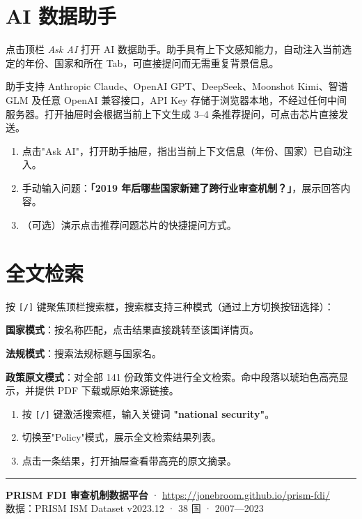\documentclass[12pt,a4paper]{article}
\newcommand{\uielem}[1]{\textit{#1}}
\newcommand{\keycap}[1]{\texttt{\footnotesize[#1]}}
\begin{document}
\section{AI 数据助手}

点击顶栏 \uielem{Ask AI} 打开 AI 数据助手。助手具有上下文感知能力，自动注入当前选定的年份、国家和所在 Tab，可直接提问而无需重复背景信息。

助手支持 Anthropic Claude、OpenAI GPT、DeepSeek、Moonshot Kimi、智谱 GLM 及任意 OpenAI 兼容接口，API Key 存储于浏览器本地，不经过任何中间服务器。打开抽屉时会根据当前上下文生成 3–4 条推荐提问，可点击芯片直接发送。

\begin{demobox}
  \begin{enumerate}
    \item 点击"Ask AI"，打开助手抽屉，指出当前上下文信息（年份、国家）已自动注入。
    \item 手动输入问题：\textbf{「2019 年后哪些国家新建了跨行业审查机制？」}，展示回答内容。
    \item （可选）演示点击推荐问题芯片的快捷提问方式。
  \end{enumerate}
\end{demobox}

\section{全文检索}

按 \keycap{/} 键聚焦顶栏搜索框，搜索框支持三种模式（通过上方切换按钮选择）：

\textbf{国家模式}：按名称匹配，点击结果直接跳转至该国详情页。

\textbf{法规模式}：搜索法规标题与国家名。

\textbf{政策原文模式}：对全部 141 份政策文件进行全文检索。命中段落以琥珀色高亮显示，并提供 PDF 下载或原始来源链接。

\begin{demobox}
  \begin{enumerate}
    \item 按 \keycap{/} 键激活搜索框，输入关键词 \textbf{"national security"}。
    \item 切换至"Policy"模式，展示全文检索结果列表。
    \item 点击一条结果，打开抽屉查看带高亮的原文摘录。
  \end{enumerate}
\end{demobox}

\vspace{2em}
\hrule
\vspace{0.8em}
{\small\color{gray}
\textbf{PRISM FDI 审查机制数据平台} · \url{https://jonebroom.github.io/prism-fdi/}\\
数据：PRISM ISM Dataset v2023.12 · 38 国 · 2007—2023
}
\end{document}
